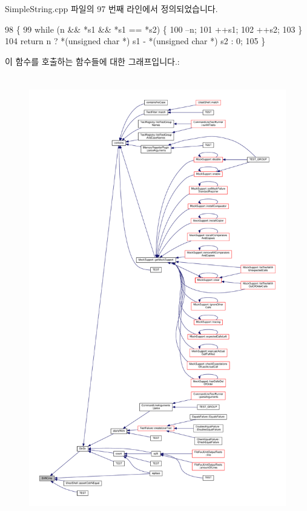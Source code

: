 Simple\+String.\+cpp 파일의 97 번째 라인에서 정의되었습니다.


\begin{DoxyCode}
98 \{
99     \textcolor{keywordflow}{while} (n && *s1 && *s1 == *s2) \{
100         --n;
101         ++s1;
102         ++s2;
103     \}
104     \textcolor{keywordflow}{return} n ? *(\textcolor{keywordtype}{unsigned} \textcolor{keywordtype}{char} *) s1 - *(\textcolor{keywordtype}{unsigned} \textcolor{keywordtype}{char} *) s2 : 0;
105 \}
\end{DoxyCode}


이 함수를 호출하는 함수들에 대한 그래프입니다.\+:
\nopagebreak
\begin{figure}[H]
\begin{center}
\leavevmode
\includegraphics[height=550pt]{class_simple_string_aa5c40b33a4812fdf30ee3e37e3f381b2_icgraph}
\end{center}
\end{figure}


